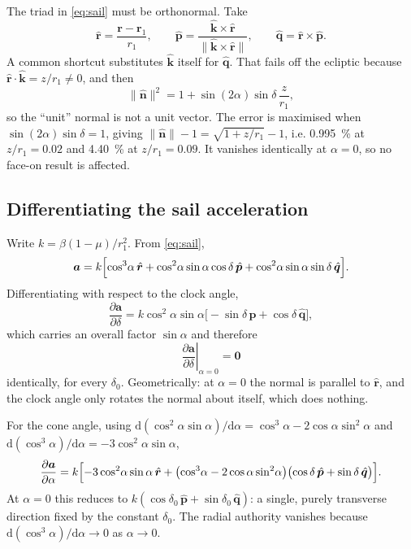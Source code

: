\documentclass[11pt,a4paper]{article}
\newcommand{\rhat}{\hat{\bm{r}}}
\newcommand{\phat}{\hat{\bm{p}}}
\newcommand{\qhat}{\hat{\bm{q}}}
\newcommand{\nhat}{\hat{\bm{n}}}
\begin{document}
The triad in \eqref{eq:sail} must be orthonormal. Take
\begin{equation}
  \rhat = \frac{\bm r-\bm r_1}{r_1}, \qquad
  \phat = \frac{\hat{\bm k}\times\rhat}{\lVert\hat{\bm k}\times\rhat\rVert},
  \qquad
  \qhat = \rhat\times\phat .
\end{equation}
A common shortcut substitutes $\hat{\bm k}$ itself for $\qhat$. That fails off
the ecliptic because $\rhat\cdot\hat{\bm k}=z/r_1\neq0$, and then
\begin{equation}
  \lVert\nhat\rVert^2 = 1 + \sin(2\alpha)\sin\delta\,\frac{z}{r_1},
\end{equation}
so the ``unit'' normal is not a unit vector. The error is maximised when
$\sin(2\alpha)\sin\delta=1$, giving
$\lVert\nhat\rVert-1=\sqrt{1+z/r_1}-1$, i.e. \SI{0.995}{\percent} at
$z/r_1=0.02$ and \SI{4.40}{\percent} at $z/r_1=0.09$. It vanishes identically at
$\alpha=0$, so no face-on result is affected.

\subsection{Differentiating the sail acceleration}

Write $k=\beta(1-\mu)/r_1^2$. From \eqref{eq:sail},
\begin{equation}
  \bm a = k\Bigl[\cos^3\!\alpha\,\rhat
        + \cos^2\!\alpha\sin\alpha\cos\delta\,\phat
        + \cos^2\!\alpha\sin\alpha\sin\delta\,\qhat\Bigr] .
\end{equation}
Differentiating with respect to the clock angle,
\begin{equation}
  \frac{\partial\bm a}{\partial\delta}
  = k\cos^2\!\alpha\sin\alpha\bigl[-\sin\delta\,\phat+\cos\delta\,\qhat\bigr],
  \label{eq:dadelta}
\end{equation}
which carries an overall factor $\sin\alpha$ and therefore
\begin{equation}
  \boxed{\;\left.\frac{\partial\bm a}{\partial\delta}\right|_{\alpha=0}=\bm0\;}
\end{equation}
identically, for every $\delta_0$. Geometrically: at $\alpha=0$ the normal is
parallel to $\rhat$, and the clock angle only rotates the normal about
itself, which does nothing.

For the cone angle, using
$\mathrm{d}(\cos^2\!\alpha\sin\alpha)/\mathrm{d}\alpha
=\cos^3\!\alpha-2\cos\alpha\sin^2\!\alpha$ and
$\mathrm{d}(\cos^3\!\alpha)/\mathrm{d}\alpha=-3\cos^2\!\alpha\sin\alpha$,
\begin{equation}
  \frac{\partial\bm a}{\partial\alpha}
  = k\Bigl[-3\cos^2\!\alpha\sin\alpha\,\rhat
    + \bigl(\cos^3\!\alpha-2\cos\alpha\sin^2\!\alpha\bigr)
      \bigl(\cos\delta\,\phat+\sin\delta\,\qhat\bigr)\Bigr] .
  \label{eq:dadalpha}
\end{equation}
At $\alpha=0$ this reduces to $k(\cos\delta_0\,\phat+\sin\delta_0\,\qhat)$: a
single, purely transverse direction fixed by the constant $\delta_0$. The radial
authority vanishes because
$\mathrm{d}(\cos^3\!\alpha)/\mathrm{d}\alpha\to0$ as $\alpha\to0$.
\end{document}
